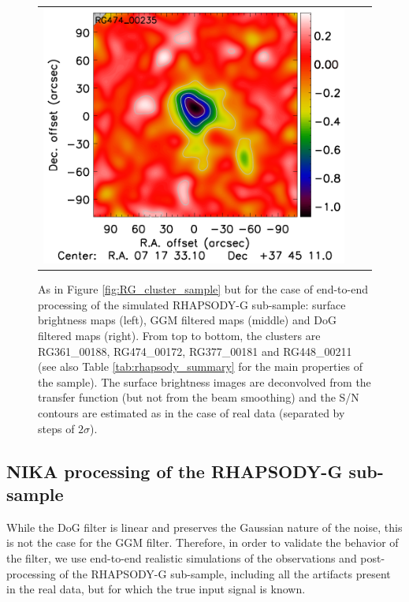 \documentclass[traditabstract]{aa}
\begin{document}
\begin{figure}[h]
{\begin{tabular}{lll}
\includegraphics[trim=2.3cm 0.7cm 0cm 0cm, clip=true, scale=1]{Figure/DoG_RG474_00235_Ymap_zobs0p4_processed_15_15_45.pdf} \\
\end{tabular}}
\caption{\footnotesize{As in Figure \ref{fig:RG_cluster_sample} but for the case of end-to-end processing of the simulated RHAPSODY-G sub-sample: surface brightness maps (left), GGM filtered maps (middle) and DoG filtered maps (right). From top to bottom, the clusters are RG361\_00188, RG474\_00172, RG377\_00181 and RG448\_00211 (see also Table \ref{tab:rhapsody_summary} for the main properties of the sample). The surface brightness images are deconvolved from the transfer function (but not from the beam smoothing) and the S/N contours are estimated as in the case of real data (separated by steps of $2 \sigma$).}}
\label{fig:RG_cluster_sample_proc}
\end{figure}

\subsection{NIKA processing of the RHAPSODY-G sub-sample}
While the DoG filter is linear and preserves the Gaussian nature of the noise, this is not the case for the GGM filter. Therefore, in order to validate the behavior of the filter, we use end-to-end realistic simulations of the observations and post-processing of the RHAPSODY-G sub-sample, including all the artifacts present in the real data, but for which the true input signal is known.
\end{document}

